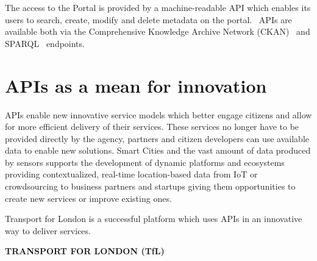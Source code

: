 The access to the Portal is provided by a machine-readable API which enables its
users to search, create, modify and delete metadata on the portal.~\citep{edp_data_portal} APIs are
available both via the Comprehensive Knowledge Archive Network (CKAN)~\citep{edp_api_v3} and
SPARQL~\citep{edp_sparql} endpoints.

\section{APIs as a mean for innovation}

APIs enable new innovative service models which better engage citizens and allow
for more efficient delivery of their services. These services no longer have to
be provided directly by the agency, partners and citizen developers can use
available data to enable new solutions. Smart Cities and the vast amount of data
produced by sensors supports the development of dynamic platforms and ecosystems
providing contextualized, real-time location-based data from IoT or crowdsourcing
to business partners and startups giving them opportunities to create new services
or improve existing ones.

Transport for London is a successful platform which uses APIs in an innovative way to deliver services.

\textbf{TRANSPORT FOR LONDON (TfL)}

